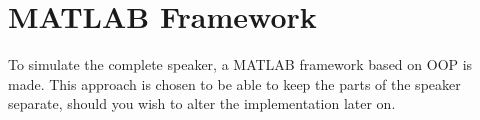 
\chapter{MATLAB Framework}
To simulate the complete speaker, a MATLAB framework based on OOP is made. This approach is chosen to be able to keep the parts of the speaker separate, should you wish to alter the implementation later on.




